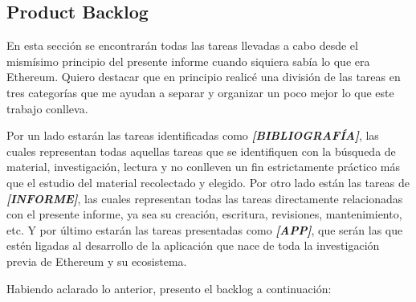 \subsection{Product Backlog}
En esta sección se encontrarán todas las tareas llevadas a cabo desde el mismísimo principio del
presente informe cuando siquiera sabía lo que era Ethereum. Quiero destacar que en principio 
realicé una división de las tareas en tres categorías que me ayudan a separar y organizar un poco
mejor lo que este trabajo conlleva. 

Por un lado estarán las tareas identificadas como \textbf{\textit{[BIBLIOGRAFÍA]}}, las cuales 
representan todas aquellas tareas que se identifiquen con la búsqueda de material, investigación,
lectura y no conlleven un fin estrictamente práctico más que el estudio del material recolectado y
elegido. Por otro lado están las tareas de \textbf{\textit{[INFORME]}}, las cuales representan 
todas las tareas directamente relacionadas con el presente informe, ya sea su creación, escritura, 
revisiones, mantenimiento, etc. Y por último estarán las tareas presentadas como 
\textbf{\textit{[APP]}}, que serán las que estén ligadas al desarrollo de la aplicación que nace
de toda la investigación previa de Ethereum y su ecosistema.

Habiendo aclarado lo anterior, presento el backlog a continuación:

